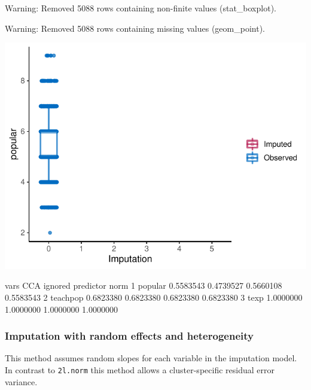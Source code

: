\documentclass[
]{jss}
\begin{document}
\begin{CodeChunk}
\begin{CodeOutput}
Warning: Removed 5088 rows containing non-finite values (stat_boxplot).
\end{CodeOutput}
\begin{CodeOutput}
Warning: Removed 5088 rows containing missing values (geom_point).
\end{CodeOutput}


\begin{center}\includegraphics{Manuscript_files/figure-latex/pop_norm_eval-1} \end{center}

\begin{CodeOutput}
      vars       CCA   ignored predictor      norm
1  popular 0.5583543 0.4739527 0.5660108 0.5583543
2 teachpop 0.6823380 0.6823380 0.6823380 0.6823380
3     texp 1.0000000 1.0000000 1.0000000 1.0000000
\end{CodeOutput}
\end{CodeChunk}

\hypertarget{imputation-with-random-effects-and-heterogeneity}{%
\subsubsection{Imputation with random effects and
heterogeneity}\label{imputation-with-random-effects-and-heterogeneity}}

This method assumes random slopes for each variable in the imputation
model. In contrast to \texttt{2l.norm} this method allows a
cluster-specific residual error variance.
\end{document}
